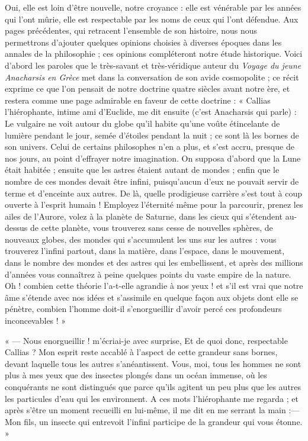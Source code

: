 \documentclass[a4paper, 11pt, oneside]{article}
\begin{document}
Oui, elle est loin d'être nouvelle, notre croyance : elle est vénérable par les années qui l'ont mûrie, elle est respectable par les noms de ceux qui l'ont défendue. Aux pages précédentes, qui retracent l'ensemble de son histoire, nous nous permettrons d'ajouter quelques opinions choisies à diverses époques dans les annales de la philosophie ; ces opinions compléteront notre étude historique. Voici d'abord les paroles que le très-savant et très-véridique auteur du \emph{Voyage du jeune Anacharsis en Grèce} met dans la conversation de son avide cosmopolite ; ce récit exprime ce que l'on pensait de notre doctrine quatre siècles avant notre ère, et restera comme une page admirable en faveur de cette doctrine : « Callias l'hiérophante, intime ami d'Euclide, me dit ensuite (c'est Anacharsis qui parle) : Le vulgaire ne voit autour du globe qu'il habite qu'une voûte étincelante de lumière pendant le jour, semée d'étoiles pendant la nuit ; ce sont là les bornes de son univers. Celui de certains philosophes n'en a plus, et s'est accru, presque de nos jours, au point d'effrayer notre imagination. On supposa d'abord que la Lune était habitée ; ensuite que les astres étaient autant de mondes ; enfin que le nombre de ces mondes devait être infini, puisqu'aucun d'eux ne pouvait servir de terme et d'enceinte aux autres. De là, quelle prodigieuse carrière s'est tout à coup ouverte à l'esprit humain ! Employez l'éternité même pour la parcourir, prenez les ailes de l'Aurore, volez à la planète de Saturne, dans les cieux qui s'étendent au-dessus de cette planète, vous trouverez sans cesse de nouvelles sphères, de nouveaux globes, des mondes qui s'accumulent les uns sur les autres : vous trouverez l'infini partout, dans la matière, dans l'espace, dans le mouvement, dans le nombre des mondes et des astres qui les embellissent, et après des millions d'années vous connaîtrez à peine quelques points du vaste empire de la nature. Oh ! combien cette théorie l'a-t-elle agrandie à nos yeux ! et s'il est vrai que notre âme s'étende avec nos idées et s'assimile en quelque façon aux objets dont elle se pénètre, combien l'homme doit-il s'enorgueillir d'avoir percé ces profondeurs inconcevables ! »

« --- Nous enorgueillir ! m'écriai-je avec surprise, Et de quoi donc, respectable Callias ? Mon esprit reste accablé à l'aspect de cette grandeur sans bornes, devant laquelle tous les autres s'anéantissent. Vous, moi, tous les hommes ne sont plus à mes yeux que des insectes plongés dans un océan immense, où les conquérants ne sont distingués que parce qu'ils agitent un peu plus que les autres les particules d'eau qui les environnent. A ces mots l'hiérophante me regarda ; et après s'être un moment recueilli en lui-même, il me dit en me serrant la main :--- Mon fils, un insecte qui entrevoit l'infini participe de la grandeur qui vous étonne. »
\end{document}
